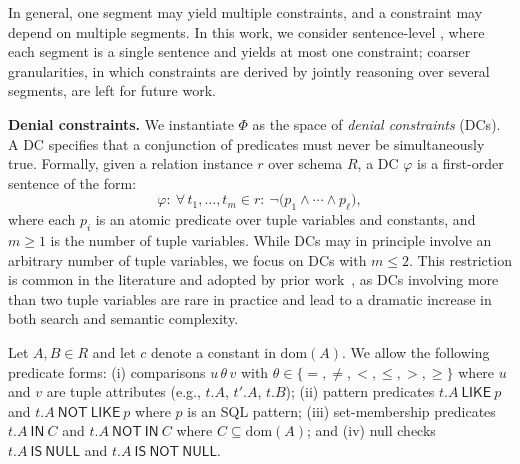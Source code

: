 
In general, one segment may yield multiple constraints, and a constraint may depend on multiple segments. In this work, we consider sentence-level , where each segment is a single sentence and yields at most one constraint; coarser granularities, in which constraints are derived by jointly reasoning over several segments, are left for future work.


\smallskip\noindent\textbf{Denial constraints.}
We instantiate $\Phi$ as the space of \emph{denial constraints} (DCs). A DC specifies that a conjunction of predicates must never be simultaneously true. Formally, given a relation instance $r$ over schema $R$, a DC $\varphi$ is a first-order sentence of the form:
\[
\varphi:\ \forall\, t_1,\ldots,t_m \in r:\ \neg\big(p_1 \land \cdots \land p_\ell\big),
\]
where each $p_i$ is an atomic predicate over tuple variables and constants, and $m \ge 1$ is the number of tuple variables. While DCs may in principle involve an arbitrary number of tuple variables, we focus on DCs with $m \le 2$. This restriction is common in the literature and adopted by prior work~\cite{chu2013discovering,martin2025false, Pena2019DiscoveryDC}, as DCs involving more than two tuple variables are rare in practice and lead to a 
dramatic increase in both search and semantic complexity.


Let $A, B \in R$ and let $c$ denote a constant in $\mathrm{dom}(A)$. We allow the following predicate forms: (i) comparisons $u\,\theta\,v$ with $\theta \in \{=,\neq,<,\leq,>,\geq\}$ where $u$ and $v$ are tuple attributes (e.g., $t.A$, $t'.A$, $t.B$); (ii) pattern predicates $t.A\ \mathsf{LIKE}\ p$ and $t.A\ \mathsf{NOT\ LIKE}\ p$ where $p$ is an SQL pattern; (iii) set-membership predicates $t.A\ \mathsf{IN}\ C$ and $t.A\ \mathsf{NOT\ IN}\ C$ where $C \subseteq \mathrm{dom}(A)$; and
(iv) null checks $t.A\ \mathsf{IS\ NULL}$ and $t.A\ \mathsf{IS\ NOT\ NULL}$.

